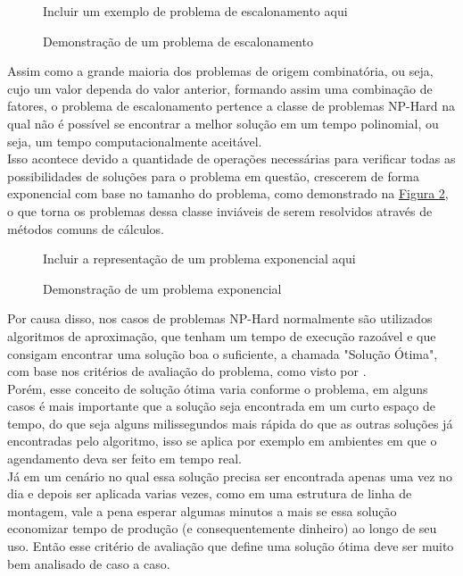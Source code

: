         \begin{figure}[ht]
            \centering
            \small{Incluir um exemplo de problema de escalonamento aqui}
            \caption{Demonstração de um problema de escalonamento}
            \label{fig:ex-problema-escalonamento}
        \end{figure}

        Assim como a grande maioria dos problemas de origem combinatória, ou seja, cujo um valor dependa do valor anterior, formando assim uma combinação de fatores, o problema de escalonamento pertence a classe de problemas NP-Hard na qual não é possível se encontrar a melhor solução em um tempo polinomial, ou seja, um tempo computacionalmente aceitável.\\

        Isso acontece devido a quantidade de operações necessárias para verificar todas as possibilidades de soluções para o problema em questão, crescerem de forma exponencial com base no tamanho do problema, 
        como demonstrado na \hyperref[fig:problema-exponencial]{Figura \ref{fig:problema-exponencial}},
        o que torna os problemas dessa classe inviáveis de serem resolvidos através de métodos comuns de cálculos.\hfill
        
        \begin{figure}[h]
            \centering
            \small{Incluir a representação de um problema exponencial aqui}
            \caption{Demonstração de um problema exponencial}
            \label{fig:problema-exponencial}
        \end{figure}
        

        Por causa disso, nos casos de problemas NP-Hard normalmente são utilizados algoritmos de aproximação, que tenham um tempo de execução razoável e que consigam encontrar uma solução boa o suficiente, a chamada "Solução Ótima",  com base nos critérios de avaliação do problema, como visto por \cite{lawler1993}.\\

        Porém, esse conceito de solução ótima varia conforme o problema, em alguns casos é mais importante que a solução seja encontrada em um curto espaço de tempo, do que seja alguns milissegundos mais rápida do que as outras soluções já encontradas pelo algoritmo, isso se aplica por exemplo em ambientes em que o agendamento deva ser feito em tempo real.\\
        
        Já em um cenário no qual essa solução precisa ser encontrada apenas uma vez no dia e depois ser aplicada varias vezes, como em uma estrutura de linha de montagem, vale a pena esperar algumas minutos a mais se essa solução economizar tempo de produção (e consequentemente dinheiro) ao longo de seu uso. Então esse critério de avaliação que define uma solução ótima deve ser muito bem analisado de caso a caso.\\

